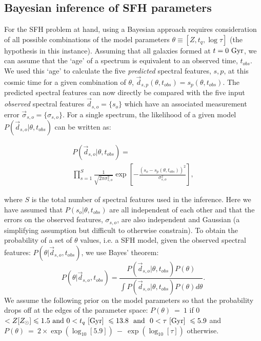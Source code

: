 \documentclass[useAMS,usenatbib]{mn2e}
\begin{document}
\subsection{Bayesian inference of SFH parameters}\label{sec:emcee}

For the SFH problem at hand, using a Bayesian approach requires consideration of all possible combinations of the model parameters $\theta \equiv [Z, t_{q}, \log \tau]$ (the hypothesis in this instance). Assuming that all galaxies formed at $t=0~\rm{Gyr}$, we can assume that the `age' of a spectrum is equivalent to an observed time, $t_{obs}$. We used this  `age' to calculate the five \emph{predicted} spectral features, $s,p$, at this cosmic time for a given combination of $\theta$, $\vec{d}_{s,p}(\theta, t_{obs}) = {s_p(\theta, t_{obs})}$. The predicted spectral features can now directly be compared with the five input \emph{observed} spectral features $\vec{d}_{s, o} = \{s_o\}$ which have an associated measurement error $\vec{\sigma}_{s, o} = \{\sigma_{s, o}\}$. For a single spectrum, the likelihood of a given model $P(\vec{d}_{s, o}|\theta, t_{obs})$ can be written as:



\begin{multline}\label{like}
P(\vec{d}_{s, o}|\theta, t_{obs}) = \\ \prod_{s=1}^{S} \frac{1}{\sqrt{2\pi\sigma_{s,o}^2}} \exp{\left[ - \frac{(s_{o} - s_{p}(\theta, t_{obs}))^2}{\sigma_{s, o}^2} \right]},
\end{multline}

where $S$ is the total number of spectral features used in the inference. Here we have assumed that $P(s_{o}|\theta, t_{obs})$ are all independent of each other and that the errors on the observed features, $\sigma_{s, o}$, are also independent and Gaussian (a simplifying assumption but difficult to otherwise constrain). To obtain the probability of a set of $\theta$ values, i.e. a SFH model, given the observed spectral features: $P(\theta|\vec{d}_{s,o}, t_{obs})$, we use Bayes' theorem:
 \begin{equation}\label{eq:bayes}
P(\theta|\vec{d}_{s,o}, t_{obs}) = \frac{P(\vec{d}_{s,o}|\theta, t_{obs})P(\theta)}{\int P(\vec{d}_{s,o} |\theta, t_{obs})P(\theta) d\theta}.
\end{equation}
We assume the following prior on the model parameters so that the probability drops off at the edges of the parameter space: ${P(\theta)~=~1}$ if 0 $< Z [Z_{\odot}] \leq 1.5 \text{ and } 0 < t_q ~\rm{[Gyr]}~ \leq 13.8 ~ \text{ and } ~ 0 < \tau  ~\rm{[Gyr]}~ \leq 5.9$ and ${P(\theta)~=~2\times\exp\left(\log_{10}[5.9]\right)~-~\exp\left(\log_{10}[\tau]\right)}$ otherwise.
\end{document}
